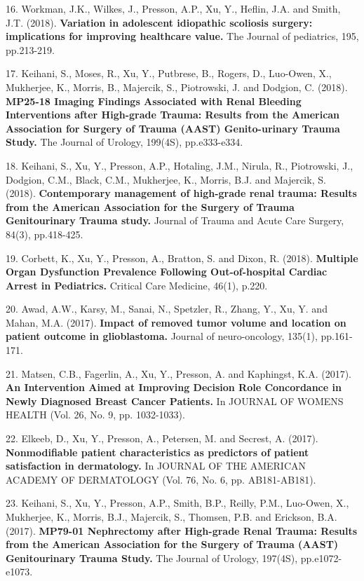 \documentclass[margin,line]{res}
\newenvironment{list1}{
  \begin{list}{\ding{113}}{%
      \setlength{\itemsep}{0in}
      \setlength{\parsep}{0in} \setlength{\parskip}{0in}
      \setlength{\topsep}{0in} \setlength{\partopsep}{0in}
      \setlength{\leftmargin}{0.17in}}}{\end{list}}
\begin{document}
\begin{resume}
\begin{list1}
\item[16.] Workman, J.K., Wilkes, J., Presson, A.P., Xu, Y., Heflin, J.A. and Smith, J.T. (2018). \textbf{Variation in adolescent idiopathic scoliosis surgery: implications for improving healthcare value.} The Journal of pediatrics, 195, pp.213-219. 
\item[17.] Keihani, S., Moses, R., Xu, Y., Putbrese, B., Rogers, D., Luo-Owen, X., Mukherjee, K., Morris, B., Majercik, S., Piotrowski, J. and Dodgion, C. (2018). \textbf{MP25-18 Imaging Findings Associated with Renal Bleeding Interventions after High-grade Trauma: Results from the American Association for Surgery of Trauma (AAST) Genito-urinary Trauma Study.} The Journal of Urology, 199(4S), pp.e333-e334. 
\item[18.] Keihani, S., Xu, Y., Presson, A.P., Hotaling, J.M., Nirula, R., Piotrowski, J., Dodgion, C.M., Black, C.M., Mukherjee, K., Morris, B.J. and Majercik, S. (2018). \textbf{Contemporary management of high-grade renal trauma: Results from the American Association for the Surgery of Trauma Genitourinary Trauma study.} Journal of Trauma and Acute Care Surgery, 84(3), pp.418-425. 
\item[19.] Corbett, K., Xu, Y., Presson, A., Bratton, S. and Dixon, R. (2018). \textbf{Multiple Organ Dysfunction Prevalence Following Out-of-hospital Cardiac Arrest in Pediatrics.} Critical Care Medicine, 46(1), p.220. 
\item[20.] Awad, A.W., Karsy, M., Sanai, N., Spetzler, R., Zhang, Y., Xu, Y. and Mahan, M.A. (2017). \textbf{Impact of removed tumor volume and location on patient outcome in glioblastoma.} Journal of neuro-oncology, 135(1), pp.161-171. 
\item[21.] Matsen, C.B., Fagerlin, A., Xu, Y., Presson, A. and Kaphingst, K.A. (2017). \textbf{An Intervention Aimed at Improving Decision Role Concordance in Newly Diagnosed Breast Cancer Patients.} In JOURNAL OF WOMENS HEALTH (Vol. 26, No. 9, pp. 1032-1033).
\item[22.] Elkeeb, D., Xu, Y., Presson, A., Petersen, M. and Secrest, A. (2017). \textbf{Nonmodifiable patient characteristics as predictors of patient satisfaction in dermatology.} In JOURNAL OF THE AMERICAN ACADEMY OF DERMATOLOGY (Vol. 76, No. 6, pp. AB181-AB181).
\item[23.] Keihani, S., Xu, Y., Presson, A.P., Smith, B.P., Reilly, P.M., Luo-Owen, X., Mukherjee, K., Morris, B.J., Majercik, S., Thomsen, P.B. and Erickson, B.A. (2017). \textbf{MP79-01 Nephrectomy after High-grade Renal Trauma: Results from the American Association for the Surgery of Trauma (AAST) Genitourinary Trauma Study.} The Journal of Urology, 197(4S), pp.e1072-e1073. 
\end{list1}


\end{resume}
\end{document}
